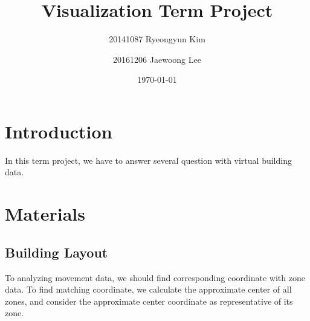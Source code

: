 \documentclass[aps, 10pt, a4paper]{article}
\title{Visualization Term Project}
\author{20141087 Ryeongyun Kim \and 20161206 Jaewoong Lee}
\date{\today}
\begin{document}
    \maketitle
    \newpage
    
    \tableofcontents
    \listoftables
    \listoffigures
    \newpage
    
    \section{Introduction}
        In this term project, we have to answer several question with virtual building data. 
    
    \section{Materials}
        \subsection{Building Layout}
            To analyzing movement data, we should find corresponding coordinate with zone data. To find matching coordinate, we calculate the approximate center of all zones, and consider the approximate center coordinate as representative of its zone. 
        
\end{document}
